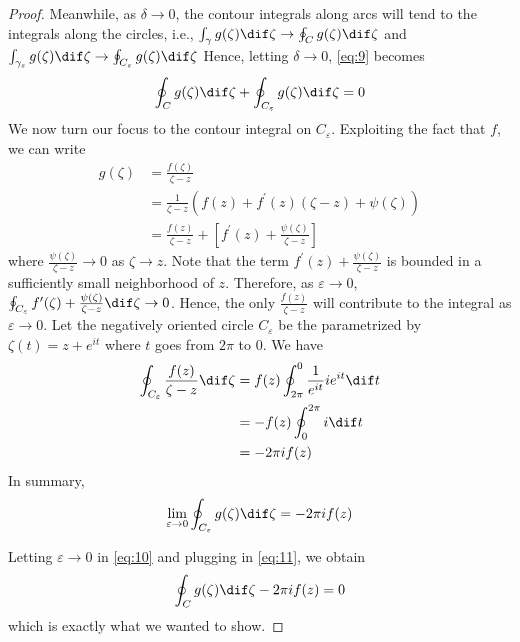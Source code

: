 \documentclass[thmcnt=section, color=cyan, 12pt]{my-elegantbook}
\begin{document}
\begin{proof}
	Meanwhile, as $\delta \to 0$,
	the contour integrals along arcs will tend to
	the integrals along the circles, i.e.,
	$\int_\gamma g(\zeta) \dif \zeta \to \oint_C g(\zeta) \dif \zeta$
	and $\int_{\gamma_{\varepsilon}} g(\zeta) \dif \zeta \to \oint_{C_\varepsilon} g(\zeta) \dif \zeta$
	Hence, letting $\delta \to 0$, \eqref{eq:9} becomes
	\begin{align}
		\oint_C g(\zeta) \dif \zeta
		+ \oint_{C_\varepsilon} g(\zeta) \dif \zeta
		= 0
		\label{eq:10}
	\end{align}
	We now turn our focus to the contour integral on $C_\varepsilon$.
	Exploiting the fact that $f$, we can write
	\begin{align*}
		g(\zeta) & = \frac{f(\zeta)}{\zeta - z}      \\
		         & = \frac{1}{\zeta - z} (
		f(z) + f^\prime(z) (\zeta - z) + \psi(\zeta)
		)                                            \\
		         & = \frac{f(z)}{\zeta - z} + \left[
			f^\prime(z) + \frac{\psi(\zeta)}{\zeta - z}
			\right]
	\end{align*}
	where $\frac{\psi(\zeta)}{\zeta - z} \to 0$ as $\zeta \to z$.
	Note that the term $f^\prime(z) + \frac{\psi(\zeta)}{\zeta - z}$ is bounded
	in a sufficiently small neighborhood of $z$.
	Therefore, as $\varepsilon \to 0$, $\oint_{C_\varepsilon} f^\prime(\zeta) + \frac{\psi(\zeta)}{\zeta - z} \dif \zeta \to 0$.
	Hence, the only $\frac{f(z)}{\zeta - z}$ will contribute to
	the integral as $\varepsilon \to 0$.
	Let the negatively oriented
	circle $C_\varepsilon$ be the parametrized by $\zeta(t) = z + e^{i t}$
	where $t$ goes from $2\pi$ to $0$.
	We have
	\begin{align*}
		\oint_{C_\varepsilon} \frac{f(z)}{\zeta - z} \dif \zeta
		 & = f(z) \oint_{2 \pi}^{0} \frac{1}{e^{i t}} i e^{i t} \dif t \\
		 & = -f(z) \oint_{0}^{2 \pi} i \dif t                          \\
		 & = - 2 \pi i f(z)
	\end{align*}
	In summary,
	\begin{align}
		\lim_{\varepsilon \to 0} \oint_{C_\varepsilon} g(\zeta) \dif \zeta = - 2 \pi i f(z)
		\label{eq:11}
	\end{align}

	Letting $\varepsilon \to 0$ in \eqref{eq:10} and plugging in \eqref{eq:11},
	we obtain
	\begin{align*}
		\oint_C g(\zeta) \dif \zeta - 2 \pi i f(z) = 0
	\end{align*}
	which is exactly what we wanted to show.
\end{proof}
\end{document}
